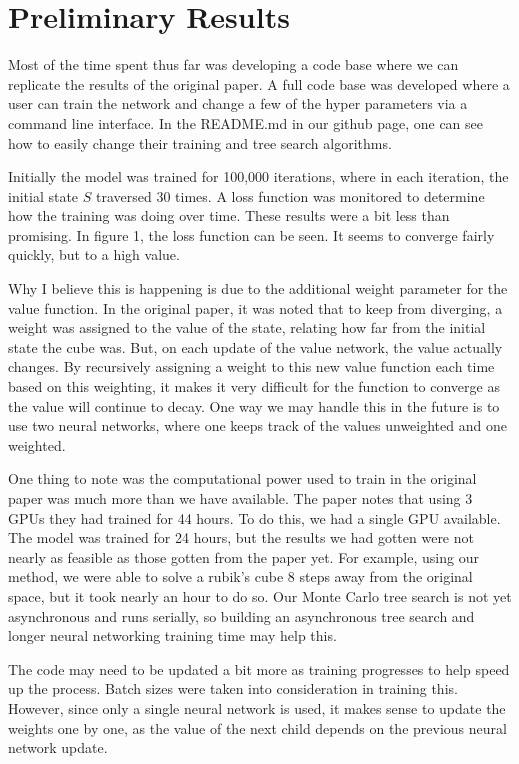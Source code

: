 \documentclass[10pt,twocolumn,letterpaper]{article}
\begin{document}

\section{Preliminary Results}
Most of the time spent thus far was developing a code base where we can replicate the results of the original paper. A full code base was developed where a user can train the network and change a few of the hyper parameters via a command line interface. In the README.md in our github page, one can see how to easily change their training and tree search algorithms. 

Initially the model was trained for 100,000 iterations, where in each iteration, the initial state $S$ traversed 30 times. A loss function was monitored to determine how the training was doing over time. These results were a bit less than promising. In figure 1, the loss function can be seen. It seems to converge fairly quickly, but to a high value.

Why I believe this is happening is due to the additional weight parameter for the value function. In the original paper, it was noted that to keep from diverging, a weight was assigned to the value of the state, relating how far from the initial state the cube was. But, on each update of the value network, the value actually changes. By recursively assigning a weight to this new value function each time based on this weighting, it makes it very difficult for the function to converge as the value will continue to decay. One way we may handle this in the future is to use two neural networks, where one keeps track of the values unweighted and one weighted. 

One thing to note was the computational power used to train in the original paper was much more than we have available. The paper notes that using 3 GPUs they had trained for 44 hours. To do this, we had a single GPU available. The model was trained for 24 hours, but the results we had gotten were not nearly as feasible as those gotten from the paper yet. For example, using our method, we were able to solve a rubik's cube 8 steps away from the original space, but it took nearly an hour to do so. Our Monte Carlo tree search is not yet asynchronous and runs serially, so building an asynchronous tree search and longer neural networking training time may help this.

The code may need to be updated a bit more as training progresses to help speed up the process. Batch sizes were taken into consideration in training this. However, since only a single neural network is used, it makes sense to update the weights one by one, as the value of the next child depends on the previous neural network update.
\end{document}
